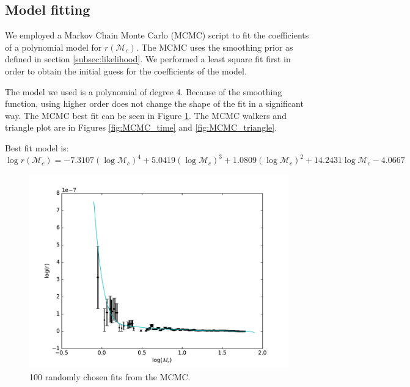 \subsection{Model fitting}
\label{subsec:fitting}
We employed a Markov Chain Monte Carlo (MCMC) script to fit the coefficients of a polynomial model for $r(\mathcal{M}_c)$. The MCMC uses the smoothing prior as defined in section \ref{subsec:likelihood}. We performed a least square fit first in order to obtain the initial guess for the coefficients of the model.

The model we used is a polynomial of degree 4. Because of the smoothing function, using higher order does not change the shape of the fit in a significant way. The MCMC best fit can be seen in Figure \ref{fig:line_MCMC}. The MCMC walkers and triangle plot are in Figures \ref{fig:MCMC_time} and \ref{fig:MCMC_triangle}.

Best fit model is:
\begin{equation}
\label{MCMC_best_fit}
\log r(\mathcal{M}_c) = -7.3107 (\log\mathcal{M}_c)^4 + 5.0419 (\log\mathcal{M}_c)^3 + 1.0809 (\log\mathcal{M}_c)^2 + 14.2431 \log\mathcal{M}_c - 4.0667
\end{equation}

\begin{figure}[ht]
  \includegraphics[width=\columnwidth]{img/line-MCMC.pdf}
  \caption{100 randomly chosen fits from the MCMC.}
  \label{fig:line_MCMC}
\end{figure}


